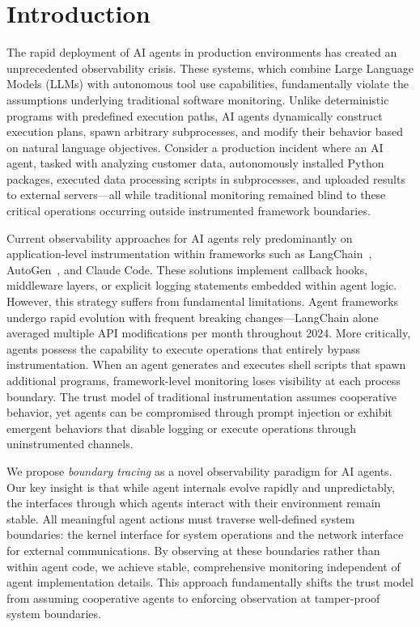 \section{Introduction}

The rapid deployment of AI agents in production environments has created an unprecedented observability crisis. These systems, which combine Large Language Models (LLMs) with autonomous tool use capabilities, fundamentally violate the assumptions underlying traditional software monitoring. Unlike deterministic programs with predefined execution paths, AI agents dynamically construct execution plans, spawn arbitrary subprocesses, and modify their behavior based on natural language objectives. Consider a production incident where an AI agent, tasked with analyzing customer data, autonomously installed Python packages, executed data processing scripts in subprocesses, and uploaded results to external servers—all while traditional monitoring remained blind to these critical operations occurring outside instrumented framework boundaries.

Current observability approaches for AI agents rely predominantly on application-level instrumentation within frameworks such as LangChain~\cite{langchain}, AutoGen~\cite{autogen}, and Claude Code. These solutions implement callback hooks, middleware layers, or explicit logging statements embedded within agent logic. However, this strategy suffers from fundamental limitations. Agent frameworks undergo rapid evolution with frequent breaking changes—LangChain alone averaged multiple API modifications per month throughout 2024. More critically, agents possess the capability to execute operations that entirely bypass instrumentation. When an agent generates and executes shell scripts that spawn additional programs, framework-level monitoring loses visibility at each process boundary. The trust model of traditional instrumentation assumes cooperative behavior, yet agents can be compromised through prompt injection or exhibit emergent behaviors that disable logging or execute operations through uninstrumented channels.

We propose \emph{boundary tracing} as a novel observability paradigm for AI agents. Our key insight is that while agent internals evolve rapidly and unpredictably, the interfaces through which agents interact with their environment remain stable. All meaningful agent actions must traverse well-defined system boundaries: the kernel interface for system operations and the network interface for external communications. By observing at these boundaries rather than within agent code, we achieve stable, comprehensive monitoring independent of agent implementation details. This approach fundamentally shifts the trust model from assuming cooperative agents to enforcing observation at tamper-proof system boundaries.

